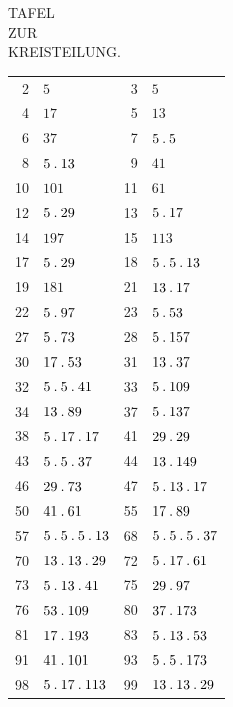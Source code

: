 \clearpage
{}%
\renewcommand{\BookRunningTitle}{Tafel zur Kreisteilung}
\begin{center}
{\large TAFEL}\\[3pt]
{ZUR}\\[3pt]
{KREISTEILUNG.}
\end{center}
%
\renewcommand{\BookRunningTitle}{Tafel zur Kreisteilung}
\begingroup\small\setlength{\tabcolsep}{4pt}
\begin{longtable}{@{}r|l@{\qquad}r|l@{}}
2 & $5$ & 3 & $5$\\
4 & $17$ & 5 & $13$\\
6 & $37$ & 7 & $5\mathbin{.} 5$\\
8 & $5\mathbin{.} 13$ & 9 & $41$\\
10 & $101$ & 11 & $61$\\
12 & $5\mathbin{.} 29$ & 13 & $5\mathbin{.} 17$\\
14 & $197$ & 15 & $113$\\
17 & $5\mathbin{.} 29$ & 18 & $5\mathbin{.} 5\mathbin{.} 13$\\
19 & $181$ & 21 & $13\mathbin{.} 17$\\
22 & $5\mathbin{.} 97$ & 23 & $5\mathbin{.} 53$\\
27 & $5\mathbin{.} 73$ & 28 & $5\mathbin{.} 157$\\
30 & $17\mathbin{.} 53$ & 31 & $13\mathbin{.} 37$\\
32 & $5\mathbin{.} 5\mathbin{.} 41$ & 33 & $5\mathbin{.} 109$\\
34 & $13\mathbin{.} 89$ & 37 & $5\mathbin{.} 137$\\
38 & $5\mathbin{.} 17\mathbin{.} 17$ & 41 & $29\mathbin{.} 29$\\
43 & $5\mathbin{.} 5\mathbin{.} 37$ & 44 & $13\mathbin{.} 149$\\
46 & $29\mathbin{.} 73$ & 47 & $5\mathbin{.} 13\mathbin{.} 17$\\
50 & $41\mathbin{.} 61$ & 55 & $17\mathbin{.} 89$\\
57 & $5\mathbin{.} 5\mathbin{.} 5\mathbin{.} 13$ & 68 & $5\mathbin{.} 5\mathbin{.} 5\mathbin{.} 37$\\
70 & $13\mathbin{.} 13\mathbin{.} 29$ & 72 & $5\mathbin{.} 17\mathbin{.} 61$\\
73 & $5\mathbin{.} 13\mathbin{.} 41$ & 75 & $29\mathbin{.} 97$\\
76 & $53\mathbin{.} 109$ & 80 & $37\mathbin{.} 173$\\
81 & $17\mathbin{.} 193$ & 83 & $5\mathbin{.} 13\mathbin{.} 53$\\
91 & $41\mathbin{.} 101$ & 93 & $5\mathbin{.} 5\mathbin{.} 173$\\
98 & $5\mathbin{.} 17\mathbin{.} 113$ & 99 & $13\mathbin{.} 13\mathbin{.} 29$\\

\end{longtable}
